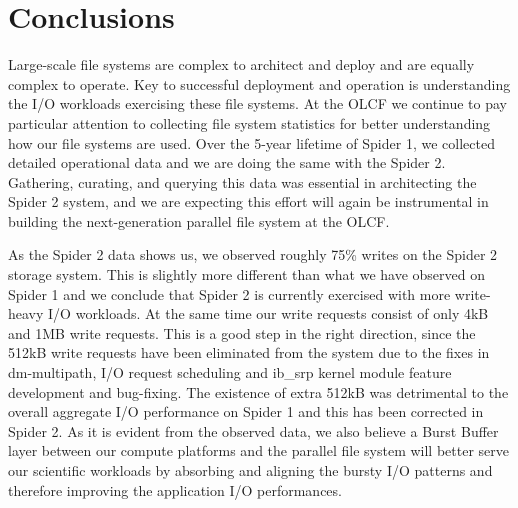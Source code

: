 \section*{Conclusions}
\label{sec:conc}

Large-scale file systems are complex to architect and deploy and are equally
complex to operate. Key to successful deployment and operation is understanding
the I/O workloads exercising these file systems. At the OLCF we continue to pay
particular attention to collecting file system statistics for better
understanding how our file systems are used. Over the 5-year lifetime of Spider
1, we collected detailed operational data and we are doing the same with the
Spider 2. Gathering, curating, and querying this data was essential in
architecting the Spider 2 system, and we are expecting this effort will again
be instrumental in building the next-generation parallel file system at the
OLCF.


As the Spider 2 data shows us, we observed roughly 75\% writes on the Spider 2
storage system. This is slightly more different than what we have observed on
Spider 1 and we conclude that Spider 2 is currently exercised with more
write-heavy I/O workloads. At the same time our write requests consist of only
4kB and 1MB write requests. This is a good step in the right direction, since
the 512kB write requests have been eliminated from the system due to the fixes
in dm-multipath, I/O request scheduling and ib\_srp kernel module feature
development and bug-fixing. The existence of extra 512kB was detrimental to the
overall aggregate I/O performance on Spider 1 and this has been corrected in
Spider 2. As it is evident from the observed data, we also believe a Burst
Buffer layer between our compute platforms and the parallel file system will
better serve our scientific workloads by absorbing and aligning the bursty I/O
patterns and therefore improving the application I/O performances. 
